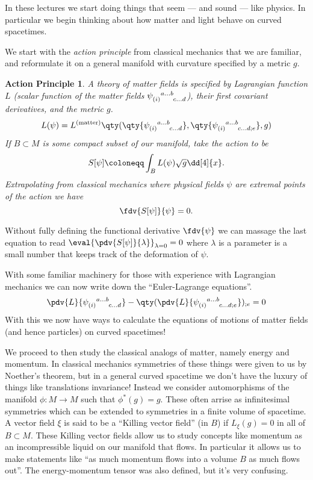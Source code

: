\documentclass{homework}
\newcommand{\psifield}{\tensor{\psi}{_{(i)}^{a\ldots b}_{c\ldots d}}}
\newcommand{\psifieldder}{\tensor{\psi}{_{(i)}^{a\ldots b}_{c\ldots d;e}}}
\newtheorem*{principle}{Action Principle}
\begin{document}
In these lectures we start doing things that seem --- and sound --- like physics.
In particular we begin thinking about how matter and light behave on curved spacetimes.

We start with the \emph{action principle} from classical mechanics that we are familiar, and reformulate it on a general manifold with curvature specified by a metric $g$.
\begin{principle}
    A theory of matter fields is specified by Lagrangian function $L$ (scalar function of the matter fields $\psifield$), their first covariant derivatives, and the metric $g$.
    \begin{equation*}
        L(\psi) = L^{\mathrm{(matter)}}\qty(\qty{\psifield}, \qty{\psifieldder}, g)
    \end{equation*}
    If $B\subset M$ is some compact subset of our manifold, take the action to be
    \begin{equation*}
        S[\psi]\defeq \int_B L(\psi)\sqrt{g}\dd[4]{x}.
    \end{equation*}
    Extrapolating from classical mechanics where physical fields $\psi$ are extremal points of the action we have
    \begin{equation*}
        \fdv{S[\psi]}{\psi} = 0.
    \end{equation*}
\end{principle}
Without fully defining the functional derivative $\fdv{\psi}$ we can massage the last equation to read $\eval{\pdv{S[\psi]}{\lambda}}_{\lambda = 0} = 0$ where $\lambda$ is a parameter is a small number that keeps track of the deformation of $\psi$.

With some familiar machinery for those with experience with Lagrangian mechanics we can now write down the ``Euler-Lagrange equations''.
\begin{equation*}
    \pdv{L}{\psifield} - \qty(\pdv{L}{\psifieldder})_{;e} = 0
\end{equation*}
With this we now have ways to calculate the equations of motions of matter fields (and hence particles) on curved spacetimes!

We proceed to then study the classical analogs of matter, namely energy and momentum.
In classical mechanics symmetries of these things were given to us by Noether's theorem, but in a general curved spacetime we don't have the luxury of things like translations invariance!
Instead we consider automorphisms of the manifold $\phi: M \to M$ such that $\phi^*(g) = g$.
These often arrise as infinitesimal symmetries which can be extended to symmetries in a finite volume of spacetime.
A vector field $\xi$ is said to be a ``Killing vector field'' (in $B$) if $L_\xi(g) = 0$ in all of $B\subset M$.
These Killing vector fields allow us to study concepts like momentum as an incompressible liquid on our manifold that flows.
In particular it allows us to make statements like ``as much momentum flows into a volume $B$ as much flows out''.
The energy-momentum tensor was also defined, but it's very confusing.
\end{document}
